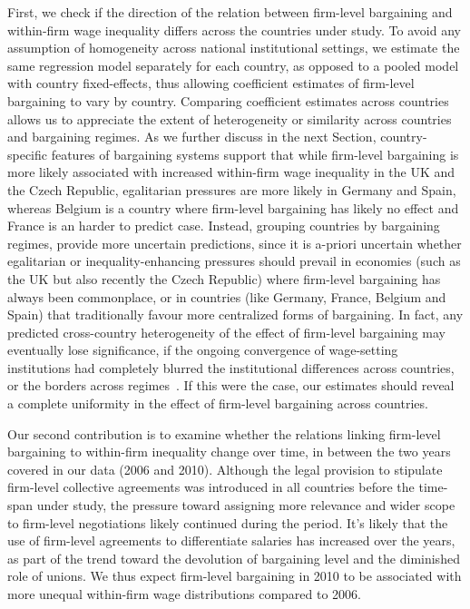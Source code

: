 \documentclass[12pt]{article}
\begin{document}
First, we check if the direction of the relation between firm-level bargaining and within-firm wage inequality differs across the countries under study. To avoid any assumption of homogeneity across national institutional settings, we estimate the same regression model separately for each country, as opposed to a pooled model with country fixed-effects, thus allowing coefficient estimates of firm-level bargaining to vary by country. Comparing coefficient estimates across countries allows us to appreciate the extent of heterogeneity or similarity across countries and bargaining regimes. As we further discuss in the next Section, country-specific features of bargaining systems support that while firm-level bargaining is more likely associated with increased within-firm wage inequality in the UK and the Czech Republic, egalitarian pressures are more likely in Germany and Spain, whereas Belgium is a country where firm-level bargaining has likely no effect and France is an harder to predict case.
Instead, grouping countries by bargaining regimes, provide more uncertain predictions, since it is a-priori uncertain whether egalitarian or inequality-enhancing pressures should prevail in economies (such as the UK but also recently the Czech Republic) where firm-level bargaining has always been commonplace, or in countries (like Germany, France, Belgium and Spain) that traditionally favour more centralized forms of bargaining.
In fact, any predicted cross-country heterogeneity of the effect of firm-level bargaining may eventually lose significance, if the ongoing convergence of wage-setting institutions had completely blurred the institutional differences across countries, or the borders across regimes~\citep[see][]{baccaro2017trajectories}.
If this were the case, our estimates should reveal a complete uniformity in the effect of firm-level bargaining across countries. 

Our second contribution is to examine whether the relations linking firm-level bargaining to within-firm inequality change over time, in between the two years covered in our data (2006 and 2010). Although the legal provision to stipulate firm-level collective agreements was introduced in all countries before the time-span under study, the pressure toward assigning more relevance and wider scope to firm-level negotiations likely continued during the period. It's likely that the use of firm-level agreements to differentiate salaries has increased over the years, as part of the trend toward the devolution of bargaining level and the diminished role of unions. We thus expect firm-level bargaining in 2010 to be associated with more unequal within-firm wage distributions compared to 2006.
\end{document}
